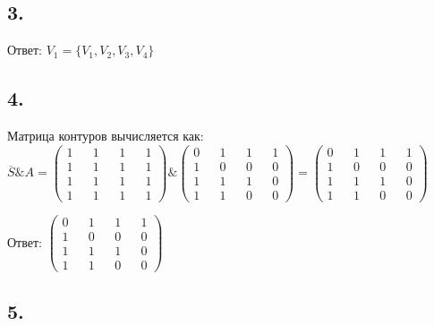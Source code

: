 \documentclass{article}
\begin{document}
\subsection*{3.}
Ответ:
$
V_1 = \{V_1, V_2, V_3, V_4\}
$

\newpage
\subsection*{4.}
Матрица контуров вычисляется как:
$
\overline{S} \& A
=
\begin{pmatrix}
  1 && 1 && 1 && 1 \\
  1 && 1 && 1 && 1 \\
  1 && 1 && 1 && 1 \\
  1 && 1 && 1 && 1
\end{pmatrix}
\& 
\begin{pmatrix}
  0 && 1 && 1 && 1 \\
  1 && 0 && 0 && 0 \\
  1 && 1 && 1 && 0 \\
  1 && 1 && 0 && 0
\end{pmatrix}
=
\begin{pmatrix}
  0 && 1 && 1 && 1 \\
  1 && 0 && 0 && 0 \\
  1 && 1 && 1 && 0 \\
  1 && 1 && 0 && 0
\end{pmatrix}
$

Ответ:
$
\begin{pmatrix}
  0 && 1 && 1 && 1 \\
  1 && 0 && 0 && 0 \\
  1 && 1 && 1 && 0 \\
  1 && 1 && 0 && 0
\end{pmatrix}
$

\subsection*{5.}

\end{document}
